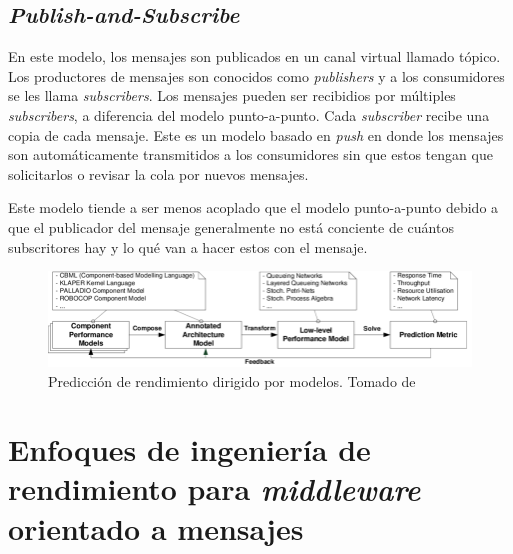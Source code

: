 \documentclass[11pt, twoside]{report}
\begin{document}
\subsection{\emph{Publish-and-Subscribe}}
En este modelo, los mensajes son publicados en un canal virtual llamado tópico. Los productores de mensajes son conocidos como \emph{publishers} y a los consumidores se les llama \emph{subscribers}. Los mensajes pueden ser recibidios por múltiples \emph{subscribers}, a diferencia del modelo punto-a-punto. Cada \emph{subscriber} recibe una copia de cada mensaje. Este es un modelo basado en \emph{push} en donde los mensajes son automáticamente transmitidos a los consumidores sin que estos tengan que solicitarlos o revisar la cola por nuevos mensajes. 

Este modelo tiende a ser menos acoplado que el modelo punto-a-punto debido a que el publicador del mensaje generalmente no está conciente de cuántos subscritores hay y lo qué van a hacer estos con el mensaje.


\begin{figure}[h]
  \centering
  \includegraphics[width=15cm]{model-driven-performance-prediction}
  \caption{\small{Predicción de rendimiento dirigido por modelos. Tomado de \cite{happe-et-al}}}
  \label{fig:model-driven-performance-prediction}
\end{figure}


\section{Enfoques de ingeniería de rendimiento para \emph{middleware} orientado a mensajes}
\end{document}
